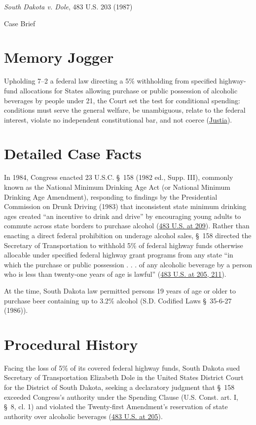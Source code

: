 \documentclass[12pt]{article}
\begin{document}
\begin{center}
{\LARGE \textit{South Dakota v. Dole}, 483 U.S. 203 (1987)\par}
\vspace{0.8em}
{\large Case Brief\par}
\end{center}
\vspace{1em}

\section{Memory Jogger}
Upholding 7--2 a federal law directing a 5\% withholding from specified highway-fund allocations for States allowing purchase or public possession of alcoholic beverages by people under 21, the Court set the test for conditional spending: conditions must serve the general welfare, be unambiguous, relate to the federal interest, violate no independent constitutional bar, and not coerce (\href{https://supreme.justia.com/cases/federal/us/483/203/}{Justia}).

\section{Detailed Case Facts}
In 1984, Congress enacted 23 U.S.C. \S~158 (1982 ed., Supp. III), commonly known as the National Minimum Drinking Age Act (or National Minimum Drinking Age Amendment), responding to findings by the Presidential Commission on Drunk Driving (1983) that inconsistent state minimum drinking ages created ``an incentive to drink and drive'' by encouraging young adults to commute across state borders to purchase alcohol (\href{https://supreme.justia.com/cases/federal/us/483/203/}{483 U.S. at 209}). Rather than enacting a direct federal prohibition on underage alcohol sales, \S~158 directed the Secretary of Transportation to withhold 5\% of federal highway funds otherwise allocable under specified federal highway grant programs from any state ``in which the purchase or public possession . . . of any alcoholic beverage by a person who is less than twenty-one years of age is lawful'' (\href{https://supreme.justia.com/cases/federal/us/483/203/}{483 U.S. at 205, 211}).

At the time, South Dakota law permitted persons 19 years of age or older to purchase beer containing up to 3.2\% alcohol (S.D. Codified Laws \S~35-6-27 (1986)).

\section{Procedural History}
Facing the loss of 5\% of its covered federal highway funds, South Dakota sued Secretary of Transportation Elizabeth Dole in the United States District Court for the District of South Dakota, seeking a declaratory judgment that \S~158 exceeded Congress's authority under the Spending Clause (U.S. Const. art. I, \S~8, cl. 1) and violated the Twenty-first Amendment's reservation of state authority over alcoholic beverages (\href{https://supreme.justia.com/cases/federal/us/483/203/}{483 U.S. at 205}).
\end{document}
